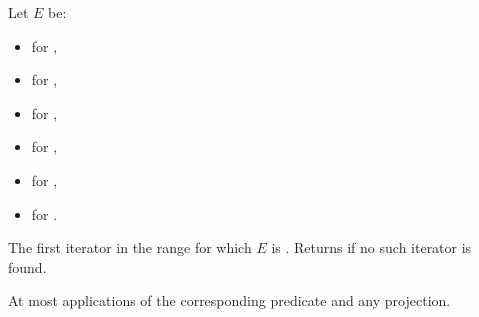 \begin{itemdescr}
\pnum
Let $E$ be:
\begin{itemize}
\item {} for ,
\item {} for ,
\item {} for ,
\item {} for ,
\item {} for ,
\item {} for .
\end{itemize}

\pnum
\returns
The first iterator  in the range 
for which $E$ is .
Returns  if no such iterator is found.

\pnum
\complexity
At most  applications
of the corresponding predicate and any projection.
\end{itemdescr}
